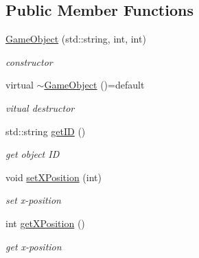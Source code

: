 \subsection*{Public Member Functions}
\begin{DoxyCompactItemize}
\item 
\mbox{\label{class_game_object_adf9acb9e2d250f42f322d9b367eb7ff4}} 
\mbox{\hyperlink{class_game_object_adf9acb9e2d250f42f322d9b367eb7ff4}{Game\+Object}} (std\+::string, int, int)
\begin{DoxyCompactList}\small\item\em constructor \end{DoxyCompactList}\item 
\mbox{\label{class_game_object_a67ae2fa6e7916c799700cd659975d8ea}} 
virtual \mbox{\hyperlink{class_game_object_a67ae2fa6e7916c799700cd659975d8ea}{$\sim$\+Game\+Object}} ()=default
\begin{DoxyCompactList}\small\item\em vitual destructor \end{DoxyCompactList}\item 
\mbox{\label{class_game_object_a54cb68b217bc51148649d10dc4f9bcbf}} 
std\+::string \mbox{\hyperlink{class_game_object_a54cb68b217bc51148649d10dc4f9bcbf}{get\+ID}} ()
\begin{DoxyCompactList}\small\item\em get object ID \end{DoxyCompactList}\item 
\mbox{\label{class_game_object_af1468b4adeb7ac7218b9bfd508a04bd6}} 
void \mbox{\hyperlink{class_game_object_af1468b4adeb7ac7218b9bfd508a04bd6}{set\+X\+Position}} (int)
\begin{DoxyCompactList}\small\item\em set x-\/position \end{DoxyCompactList}\item 
\mbox{\label{class_game_object_ab5e682e5f30212535f21b00f7ac5aa7d}} 
int \mbox{\hyperlink{class_game_object_ab5e682e5f30212535f21b00f7ac5aa7d}{get\+X\+Position}} ()
\begin{DoxyCompactList}\small\item\em get x-\/position \end{DoxyCompactList}\item 

\end{DoxyCompactItemize}
